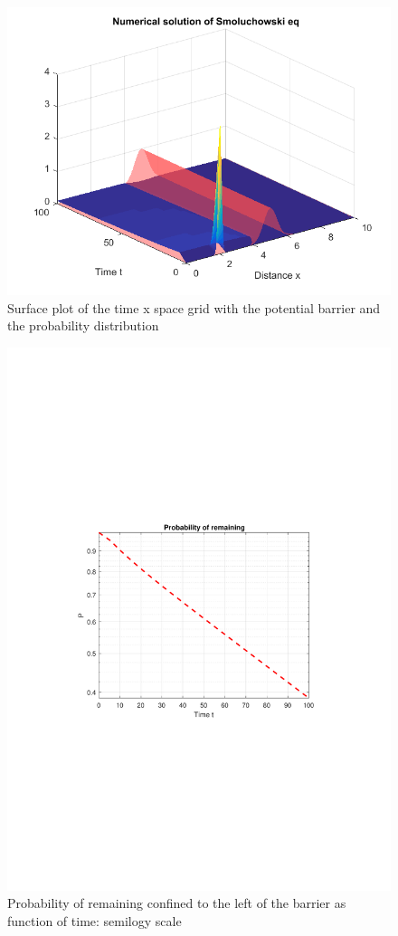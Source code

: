 \documentclass[11pt,letterpaper]{article}
\begin{document}
\begin{figure}
\centering
\includegraphics[width=0.9\linewidth]{./serf1}
\caption{Surface plot of the time x space grid with the potential barrier and the probability distribution}
\label{fig:surf}
\end{figure}
%
\begin{figure}
\centering
\includegraphics[width=1\linewidth]{./prob_remaining}
\caption{Probability of remaining confined to the left of the barrier as function of time: semilogy scale}
\label{fig:prob_remaining}
\end{figure}
\end{document}
